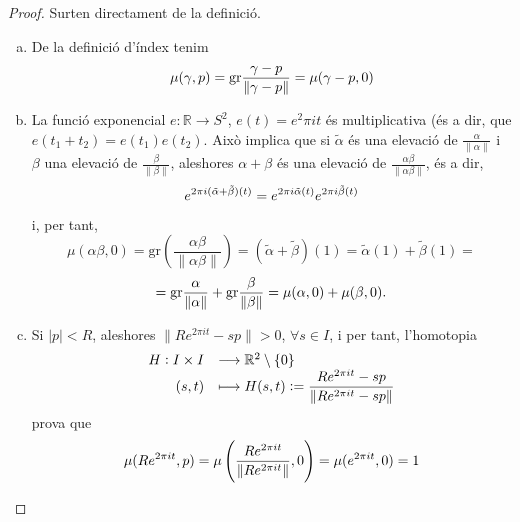 \documentclass[../main.tex]{subfiles}
\begin{document}
\begin{proof}
Surten directament de la definició.
\begin{enumerate}[(a)]
    \item De la definició d'índex tenim
    \begin{equation}
        \notag
        \mu(\gamma,p) = \mathrm{gr}\frac{\gamma-p}{\|\gamma-p\|} = \mu(\gamma-p,0)
    \end{equation}
    \item La funció exponencial $e:\mathbb{R}\rightarrow S^2$, $e(t) = e^2\pi it$ és multiplicativa (és a dir, que $e(t_1+t_2) = e(t_1)e(t_2)$. Això implica que si $\tilde{\alpha}$ és una elevació de $\frac{\alpha}{\|\alpha\|}$ i $\beta$ una elevació de $\frac{\beta}{\|\beta\|}$, aleshores $\alpha+\beta$ és una elevació de $\frac{\alpha\beta}{\|\alpha\beta\|}$, és a dir,
    \begin{equation}
        \notag
        e^{2\pi i(\tilde{\alpha}+\tilde{\beta})(t)} = e^{2\pi i\tilde{\alpha}(t)}e^{2\pi i\tilde{\beta}(t)}
    \end{equation}
    i, per tant, 
    \begin{equation}
        \mu(\alpha\beta,0) = \mathrm{gr}\left(\frac{\alpha\beta}{\|\alpha\beta\|}\right) = (\tilde{\alpha}+\tilde{\beta})(1) = \tilde{\alpha}(1)+\tilde{\beta}(1) = 
    \end{equation}
    \begin{equation}
        \notag
        = \mathrm{gr}\frac{\alpha}{\|\alpha\|}+\mathrm{gr}\frac{\beta}{\|\beta\|}=\mu(\alpha,0)+\mu(\beta,0).
    \end{equation}
    \item Si $|p|<R$, aleshores $\|Re^{2\pi it}-sp\|>0$, $\forall s\in I$, i per tant, l'homotopia
    \begin{equation}
        \notag
        \begin{array}{rl}
            H:I\times I & \longrightarrow\mathbb{R}^2\setminus\{0\} \\
            (s,t) & \longmapsto H(s,t):=\dfrac{Re^{2\pi it}-sp}{\|Re^{2\pi it}-sp\|}
        \end{array}
    \end{equation}
    prova que
    \begin{equation}
        \notag
        \mu(Re^{2\pi it},p) = \mu\left(\frac{Re^{2\pi it}}{\|Re^{2\pi it}\|},0\right) = \mu(e^{2\pi it},0)=1
    \end{equation}
    

\end{enumerate}
\end{proof}
\end{document}
